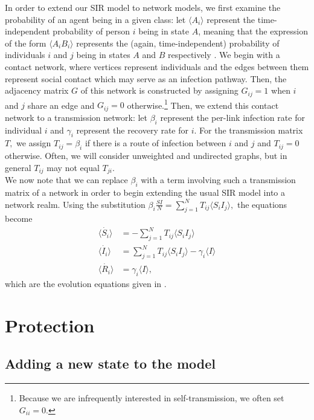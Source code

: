 \documentclass[12pt,a4paper]{article}
\begin{document}
In order to extend our SIR model to network models, we first examine the probability of an agent being in a given class: let $\langle A_i \rangle$ represent the time-independent probability of person $i$ being in state $A$, meaning that the expression of the form $\langle A_i B_i \rangle$ represents the (again, time-independent) probability of individuals $i$ and $j$ being in states $A$ and $B$ respectively \cite{kiss15}. We begin with a contact network, where vertices represent individuals and the edges between them represent social contact which may serve as an infection pathway. Then, the adjacency matrix $G$ of this network is constructed by assigning $G_{ij} = 1$ when $i$ and $j$ share an edge and $G_{ij} = 0$ otherwise.\footnote{Because we are infrequently interested in self-transmission, we often set $G_{ii}=0.$} Then, we extend this contact network to a transmission network: let $\beta_i$ represent the per-link infection rate for individual $i$ and $\gamma_i$ represent the recovery rate for $i$. For the transmission matrix $T,$ we assign $T_{ij}=\beta_i$ if there is a route of infection between $i$ and $j$ and $T_{ij}=0$ otherwise. Often, we will consider unweighted and undirected graphs, but in general $T_{ij}$ may not equal $T_{ji}$.\\
We now note that we can replace $\beta_i$ with a term involving such a transmission matrix of a network in order to begin extending the usual SIR model into a network realm. Using the substitution $ \beta_i \frac{SI}{N} = \sum^{N}_{j=1}T_{ij} \langle S_i I_j \rangle,$ the equations become
\begin{align*}
\dot{\langle S_i \rangle} & = -\sum^{N}_{j=1}T_{ij} \langle S_i I_j \rangle\\
\dot{\langle I_i \rangle} & =\sum^{N}_{j=1}T_{ij}\langle S_i I_j \rangle - \gamma_i \langle I \rangle \\
\dot{\langle R_i \rangle} & = \gamma_i \langle I \rangle,
\end{align*}
which are the evolution equations given in \cite{kiss15}.

\section{Protection}

\subsection{Adding a new state to the model}
\end{document}
